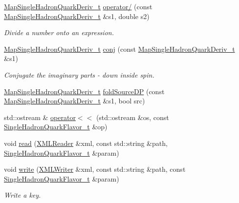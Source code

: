 \begin{DoxyCompactItemize}
\mbox{\hyperlink{namespaceHadron_aa588220689caea8a6aad4d0296526e6b}{Map\+Single\+Hadron\+Quark\+Deriv\+\_\+t}} \mbox{\hyperlink{namespaceHadron_aee22779796ebd9e7ee8772c1eb965b6c}{operator/}} (const \mbox{\hyperlink{namespaceHadron_aa588220689caea8a6aad4d0296526e6b}{Map\+Single\+Hadron\+Quark\+Deriv\+\_\+t}} \&s1, double s2)
\begin{DoxyCompactList}\small\item\em Divide a number onto an expression. \end{DoxyCompactList}\item 
\mbox{\hyperlink{namespaceHadron_aa588220689caea8a6aad4d0296526e6b}{Map\+Single\+Hadron\+Quark\+Deriv\+\_\+t}} \mbox{\hyperlink{namespaceHadron_a218b77b239d871def6267d4b34bdf7c1}{conj}} (const \mbox{\hyperlink{namespaceHadron_aa588220689caea8a6aad4d0296526e6b}{Map\+Single\+Hadron\+Quark\+Deriv\+\_\+t}} \&s1)
\begin{DoxyCompactList}\small\item\em Conjugate the imaginary parts -\/ down inside spin. \end{DoxyCompactList}\item 
\mbox{\hyperlink{namespaceHadron_aa588220689caea8a6aad4d0296526e6b}{Map\+Single\+Hadron\+Quark\+Deriv\+\_\+t}} \mbox{\hyperlink{namespaceHadron_af80d375e34002f168b53c74370f8dd3a}{fold\+Source\+DP}} (const \mbox{\hyperlink{namespaceHadron_aa588220689caea8a6aad4d0296526e6b}{Map\+Single\+Hadron\+Quark\+Deriv\+\_\+t}} \&s1, bool src)
\item 
std\+::ostream \& \mbox{\hyperlink{namespaceHadron_a7b979b64d9a0ab8025031a090f9494c0}{operator$<$$<$}} (std\+::ostream \&os, const \mbox{\hyperlink{structHadron_1_1SingleHadronQuarkFlavor__t}{Single\+Hadron\+Quark\+Flavor\+\_\+t}} \&op)
\item 
void \mbox{\hyperlink{namespaceHadron_af2bd5c5dd10efe01fefda4ec1c5ce04d}{read}} (\mbox{\hyperlink{classADATXML_1_1XMLReader}{X\+M\+L\+Reader}} \&xml, const std\+::string \&path, \mbox{\hyperlink{structHadron_1_1SingleHadronQuarkFlavor__t}{Single\+Hadron\+Quark\+Flavor\+\_\+t}} \&param)
\item 
void \mbox{\hyperlink{namespaceHadron_aa1f03b8b2d78349da848f9a9bcf19e33}{write}} (\mbox{\hyperlink{classADATXML_1_1XMLWriter}{X\+M\+L\+Writer}} \&xml, const std\+::string \&path, const \mbox{\hyperlink{structHadron_1_1SingleHadronQuarkFlavor__t}{Single\+Hadron\+Quark\+Flavor\+\_\+t}} \&param)
\begin{DoxyCompactList}\small\item\em Write a key. \end{DoxyCompactList}\item 

\end{DoxyCompactItemize}
